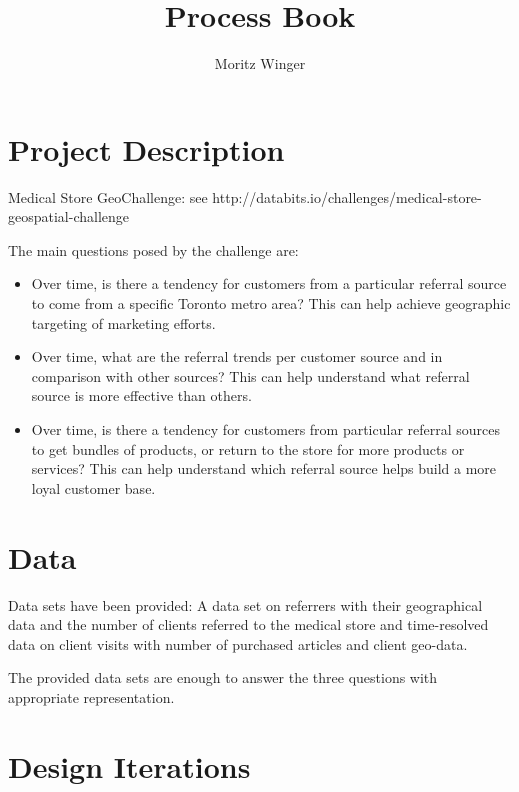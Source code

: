 \documentclass[12pt]{article}
\begin{document}
\title{Process Book}
\author{Moritz Winger}
\maketitle

\section{Project Description}

Medical Store GeoChallenge: see http://databits.io/challenges/medical-store-geospatial-challenge

The main questions posed by the challenge are:

\begin{itemize}
\item Over time, is there a tendency for customers from a particular referral source to come from a specific Toronto metro
area? This can help achieve geographic targeting of marketing efforts.

\item  Over time, what are the referral trends per customer source and in comparison with other sources?
This can help understand what referral source is more effective than others.

\item Over time, is there a tendency for customers from particular referral sources to get bundles of products, or return
to the store for more products or services? This can help understand which referral source helps build a more loyal
customer base.
\end{itemize}


\section{Data}

Data sets have been provided: A data set on referrers with their geographical data and the number of clients
referred to the medical store and time-resolved data on client visits with number of purchased articles and client
geo-data.

The provided data sets are enough to answer the three questions with appropriate representation.

\section{Design Iterations}
\end{document}
